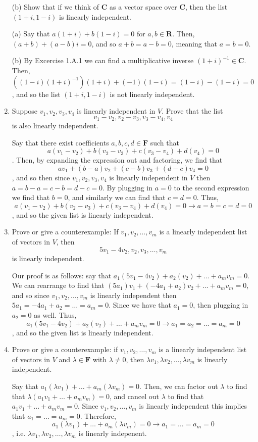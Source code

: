 \documentclass{book}
\begin{document}
\begin{enumerate}
(b) Show that if we think of \(\textbf{C}\) as a vector space over \(\textbf{C}\), then the list \((1+i,1-i)\) is linearly independent.

(a) Say that \(a(1+i)+b(1-i)=0\) for \(a,b \in \textbf{R}\).  Then, \((a+b)+(a-b)i=0\), and so \(a+b=a-b=0\), meaning that \(a=b=0\).

(b) By Excercise 1.A.1 we can find a multiplicative inverse \((1+i)^{-1} \in \textbf{C}\).  Then, \(((1-i)(1+i)^{-1})(1+i)+(-1)(1-i)=(1-i)-(1-i)=0\), and so the list \((1+i,1-i)\) is not linearly independent.

\item Suppose \(v_1,v_2,v_3,v_4\) is linearly independent in \(V\).  Prove that the list \[v_1-v_2,v_2-v_3,v_3-v_4,v_4\] is also linearly independent.

Say that there exist coefficients \(a,b,c,d \in \textbf{F}\) such that \[a(v_1-v_2)+b(v_2-v_3)+c(v_3-v_4)+d(v_4)=0\].  Then, by expanding the expression out and factoring, we find that \[av_1+(b-a)v_2+(c-b)v_3+(d-c)v_4=0\], and so then since \(v_1,v_2,v_3,v_4\) is linearly independent in \(V\) then \(a=b-a=c-b=d-c=0\).  By plugging in \(a=0\) to the second expression we find that \(b=0\), and similarly we can find that \(c=d=0\).  Thus, \[a(v_1-v_2)+b(v_2-v_3)+c(v_3-v_4)+d(v_4)=0 \rightarrow a=b=c=d=0\], and so the given list is linearly independent.

\item Prove or give a counterexample: If \(v_1,v_2,\dots,v_m\) is a linearly independent list of vectors in \(V\), then \[5v_1-4v_2,v_2,v_3,\dots,v_m\] is linearly independent.

Our proof is as follows: say that \(a_1(5v_1-4v_2)+a_2(v_2)+\dots+a_mv_m=0\).  We can rearrange to find that \((5a_1)v_1+(-4a_1+a_2)v_2+\dots+a_mv_m=0\), and so since \(v_1,v_2,\dots,v_m\) is linearly independent then \(5a_1=-4a_1+a_2=\dots=a_m=0\).  Since we have that \(a_1=0\), then plugging in \(a_2=0\) as well.  Thus, \[a_1(5v_1-4v_2)+a_2(v_2)+\dots+a_mv_m=0 \rightarrow a_1=a_2=\dots=a_m=0\], and so the given list is linearly independent.

\item Prove or give a counterexample: if \(v_1, v_2,\dots,v_m\) is a linearly independent list of vectors in \(V\) and \(\lambda \in \textbf{F}\) with \(\lambda \neq 0\), then \(\lambda{v_1},\lambda{v_2},\dots,\lambda{v_m}\) is linearly independent.

Say that \(a_1(\lambda{v_1})+\dots+a_m(\lambda{v_m})=0\).  Then, we can factor out \(\lambda\) to find that \(\lambda(a_1v_1+\dots+a_mv_m)=0\), and cancel out \(\lambda\) to find that \(a_1v_1+\dots+a_mv_m=0\).  Since \(v_1, v_2,\dots,v_m\) is linearly independent this implies that \(a_1=\dots=a_m=0\).  Therefore, \[a_1(\lambda{v_1})+\dots+a_m(\lambda{v_m})=0 \rightarrow a_1=\dots=a_m=0\], i.e. \(\lambda{v_1},\lambda{v_2},\dots,\lambda{v_m}\) is linearly indepenent.


\end{enumerate}
\end{document}
